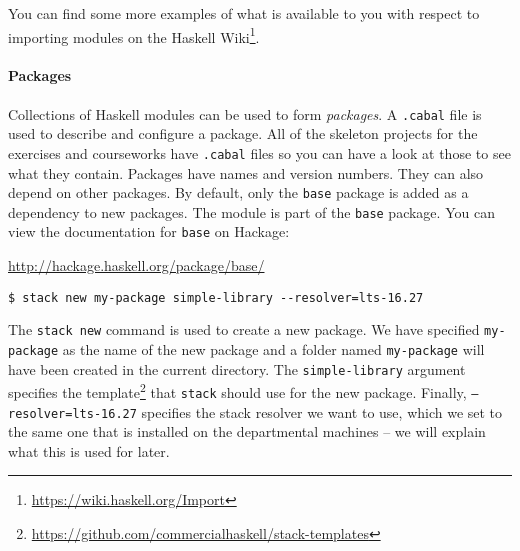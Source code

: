 You can find some more examples of what is available to you with respect to importing modules on the Haskell Wiki\footnote{\url{https://wiki.haskell.org/Import}}.


\paragraph{Packages} Collections of Haskell modules can be used to form \emph{packages}. A \texttt{\small .cabal} file is used to describe and configure a package. All of the skeleton projects for the exercises and courseworks have \texttt{\small .cabal} files so you can have a look at those to see what they contain. Packages have names and version numbers. They can also depend on other packages. By default, only the \texttt{\small base} package is added as a dependency to new packages. The  module is part of the \texttt{\small base} package. You can view the documentation for \texttt{\small base} on Hackage:
\begin{center}\small 
	\url{http://hackage.haskell.org/package/base/}
\end{center}

\begin{verbatim}
$ stack new my-package simple-library --resolver=lts-16.27
\end{verbatim}
The \texttt{\small stack new} command is used to create a new package. We have specified \texttt{\small my-package} as the name of the new package and a folder named \texttt{\small my-package} will have been created in the current directory. The \texttt{\small simple-library} argument specifies the template\footnote{\url{https://github.com/commercialhaskell/stack-templates}} that \texttt{\small stack} should use for the new package. Finally, \texttt{\small --resolver=lts-16.27} specifies the stack resolver we want to use, which we set to the same one that is installed on the departmental machines -- we will explain what this is used for later.

